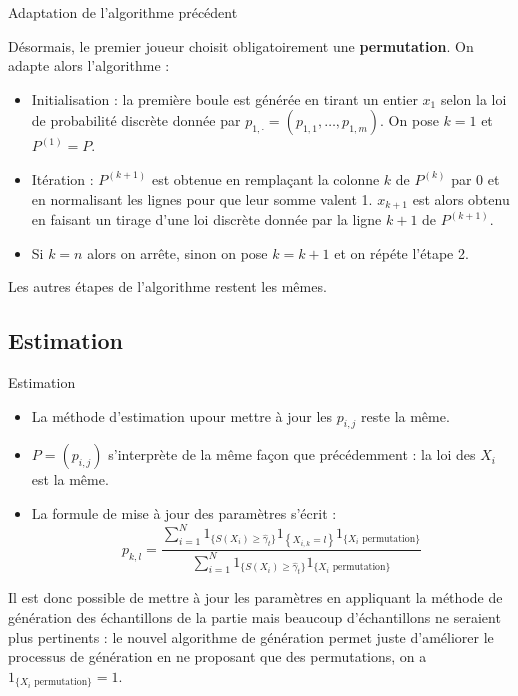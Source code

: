 \documentclass[10pt,xcolor=table,color={dvipsnames,usenames},ignorenonframetext,usepdftitle=false,french]{beamer}
\begin{document}
\begin{frame}{Adaptation de l'algorithme précédent}

Désormais, le premier joueur choisit obligatoirement une
\textbf{permutation}. On adapte alors l'algorithme :

\begin{itemize}
\item Initialisation : la première boule est générée en tirant un entier $x_1$ selon la loi de probabilité discrète donnée par $p_{1,\cdot} = (p_{1,1},\dots, p_{1,m})$. On pose $k=1$ et $P^{(1)} = P$.
\item Itération : $P^{(k+1)}$ est obtenue en remplaçant la colonne $k$ de $P^{(k)}$ par 0 et en normalisant les lignes pour que leur somme valent 1. $x_{k+1}$ est alors obtenu en faisant un tirage d'une loi discrète donnée par la ligne $k+1$ de $P^{(k+1)}$. 
\item Si $k=n$ alors on arrête, sinon on pose $k=k+1$ et on répéte l'étape 2.
\end{itemize}

Les autres étapes de l'algorithme restent les mêmes.

\end{frame}

\subsection{Estimation}\label{estimation}

\begin{frame}{Estimation}

\begin{itemize}
\item La méthode d'estimation upour mettre à jour les $p_{i,j}$ reste la même.
\item $P=(p_{i,j})$ s'interprète de la même façon que précédemment : la loi des $X_i$ est la même.
\item La formule de mise à jour des paramètres s'écrit :
$$p_{k,l}=\frac{
\sum_{i=1}^{N}1_{\{S(X_{i})\geq\hat{\gamma}_{t}\}}1_{\left\{ X_{i,k}=l\right\} }
1_{\{X_{i}\text{ permutation}\}}
}{
\sum_{i=1}^{N}1_{\{S(X_{i})\geq\hat{\gamma}_{t}\}}
1_{\{X_{i}\text{ permutation}\}}
}$$
\end{itemize}

Il est donc possible de mettre à jour les paramètres en appliquant la
méthode de génération des échantillons de la partie mais beaucoup
d'échantillons ne seraient plus pertinents : le nouvel algorithme de
génération permet juste d'améliorer le processus de génération en ne
proposant que des permutations, on a
\(1_{\{X_{i}\text{ permutation}\}} = 1\).

\end{frame}
\end{document}
